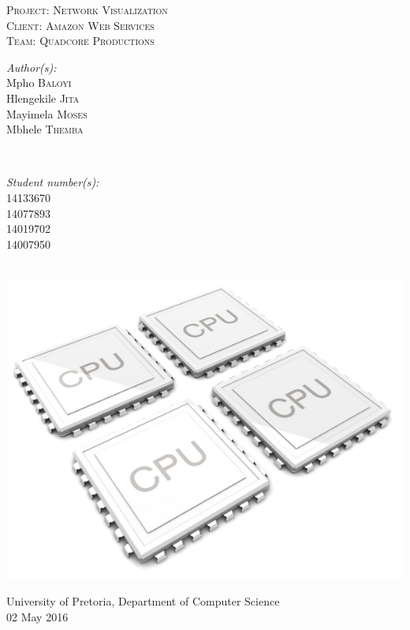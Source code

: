 \documentclass[a4paper,12pt]{article}
\begin{document}
\begin{titlepage}
\center

\textsc{\LARGE Project: Network Visualization}\\[1.5cm]
\textsc{\Large Client: Amazon Web Services}\\[0.5cm]
\textsc{\large Team: Quadcore Productions}\\[0.5cm]

\begin{minipage}{0.4\textwidth}
\begin{flushleft} \large
\emph{Author(s):}\\
Mpho \textsc{Baloyi}\\
Hlengekile \textsc{Jita}\\
Mayimela \textsc{Moses}\\
Mbhele \textsc{Themba}\\
\end{flushleft}
\end{minipage}
~
\begin{minipage}{0.4\textwidth}
\begin{flushright} \large
\emph{Student number(s):} \\
14133670\\ %
14077893\\
14019702\\
14007950\\
\end{flushright}
\end{minipage}\\

\includegraphics[width=\textwidth]{2012-quad-core-phones}

{\large University of Pretoria, Department of Computer Science}\\

{\large 02 May 2016}\\[3cm]

\vfil

\end{titlepage}
\newpage
\tableofcontents
\newpage
\end{document}
